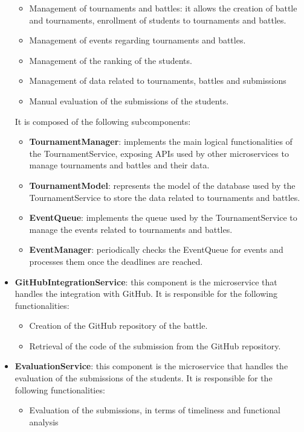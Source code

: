 \begin{itemize}
    \begin{itemize}
        \item Management of tournaments and battles: it allows the creation of battle and tournaments, enrollment of students to tournaments and battles.
        \item Management of events regarding tournaments and battles.
        \item Management of the ranking of the students.
        \item Management of data related to tournaments, battles and submissions
        \item Manual evaluation of the submissions of the students.
    \end{itemize}
    It is composed of the following subcomponents:
    \begin{itemize}
        \item \textbf{TournamentManager}: implements the main logical functionalities of the TournamentService, exposing APIs used by other microservices to manage tournaments and battles and their data.
        \item \textbf{TournamentModel}: represents the model of the database used by the TournamentService to store the data related to tournaments and battles.
        \item \textbf{EventQueue}: implements the queue used by the TournamentService to manage the events related to tournaments and battles.
        \item \textbf{EventManager}: periodically checks the EventQueue for events and processes them once the deadlines are reached.
    \end{itemize}
    \item \textbf{GitHubIntegrationService}: this component is the microservice that handles the integration with GitHub. It is responsible for the following functionalities:
    \begin{itemize}
        \item Creation of the GitHub repository of the battle.
        \item Retrieval of the code of the submission from the GitHub repository.
    \end{itemize}
    \item \textbf{EvaluationService}: this component is the microservice that handles the evaluation of the submissions of the students. It is responsible for the following functionalities:
    \begin{itemize}
        \item Evaluation of the submissions, in terms of timeliness and functional analysis 

\end{itemize}
\end{itemize}
